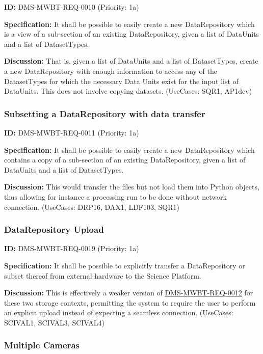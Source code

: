 \documentclass[SE,toc,lsstdraft]{lsstdoc}
\begin{document}
\label{DMS-MWBT-REQ-0010}
\textbf{ID:} DMS-MWBT-REQ-0010 (Priority: 1a)

\textbf{Specification:}
It shall be possible to easily create a new DataRepository which is a view of a sub-section of an existing DataRepository, given a list of DataUnits and a list of DatasetTypes.

\textbf{Discussion:}
That is, given a list of DataUnits and a list of DatasetTypes, create a new DataRepository with enough information to access any of the DatasetTypes for which the necessary Data Units exist for the input list of DataUnits. This does not involve copying datasets. (UseCases: SQR1, AP1dev)

\subsubsection{Subsetting a DataRepository with data transfer}

\label{DMS-MWBT-REQ-0011}
\textbf{ID:} DMS-MWBT-REQ-0011 (Priority: 1a)

\textbf{Specification:}
It shall be possible to easily create a new DataRepository which contains a copy of a sub-section of an existing DataRepository, given a list of DataUnits and a list of DatasetTypes.

\textbf{Discussion:}
This would transfer the files but not load them into Python objects, thus allowing for instance a processing run to be done without network connection. (UseCases: DRP16, DAX1, LDF103, SQR1)

\subsubsection{DataRepository Upload}

\label{DMS-MWBT-REQ-0019}
\textbf{ID:} DMS-MWBT-REQ-0019 (Priority: 1a)

\textbf{Specification:}
It shall be possible to explicitly transfer a DataRepository or subset thereof from external hardware to the Science Platform.

\textbf{Discussion:}
This is effectively a weaker version of \hyperref[DMS-MWBT-REQ-0012]{DMS-MWBT-REQ-0012} for these two storage contexts, permitting the system to require the user to perform an explicit upload instead of expecting a seamless connection. (UseCases: SCIVAL1, SCIVAL3, SCIVAL4)

\subsubsection{Multiple Cameras}
\end{document}
